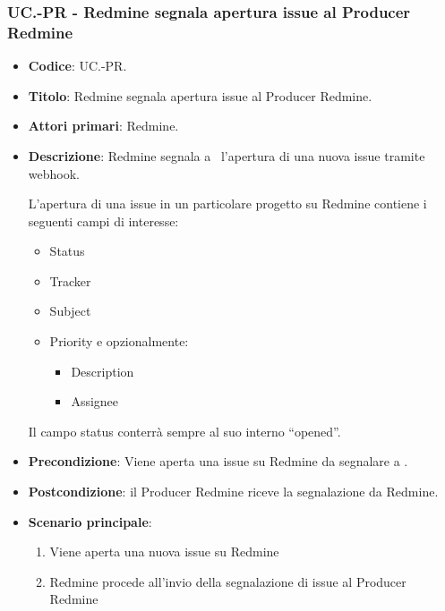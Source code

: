 \subsubsection{UC\theuccount.\thesubuccount-PR - Redmine segnala apertura issue al Producer Redmine}
\begin{itemize}
	\item \textbf{Codice}: UC\theuccount.\thesubuccount-PR.
	\item \textbf{Titolo}: Redmine segnala apertura issue al Producer Redmine.
	\item \textbf{Attori primari}: Redmine.
	\item \textbf{Descrizione}: Redmine segnala a \progetto\ l'apertura di una nuova issue tramite webhook.
	
	L'apertura di una issue in un particolare progetto su Redmine contiene i seguenti campi di interesse:
	\begin{itemize}
		\item Status
		\item Tracker
		\item Subject
		\item Priority e opzionalmente:
		\begin{itemize}
			\item Description
			\item Assignee
		\end{itemize}
	\end{itemize}
	Il campo status conterrà sempre al suo interno ``opened''.
	\item \textbf{Precondizione}: Viene aperta una issue su Redmine da
	segnalare a \progetto.
	\item \textbf{Postcondizione}: il Producer Redmine riceve la segnalazione da Redmine.
	\item \textbf{Scenario principale}: 
	\begin{enumerate}
		\item Viene aperta una nuova issue su Redmine
		\item Redmine procede all'invio della segnalazione di issue al Producer Redmine
	\end{enumerate}
	
\end{itemize}

